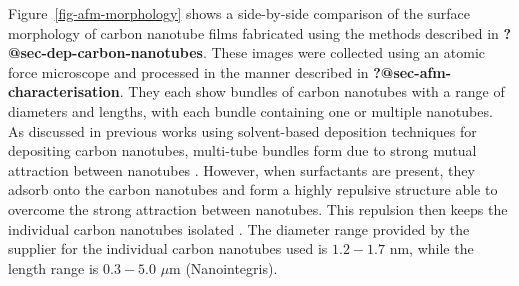 \documentclass[
  a4paper,
]{scrbook}
\begin{document}
Figure~\ref{fig-afm-morphology} shows a side-by-side comparison of the
surface morphology of carbon nanotube films fabricated using the methods
described in \textbf{?@sec-dep-carbon-nanotubes}. These images were
collected using an atomic force microscope and processed in the manner
described in \textbf{?@sec-afm-characterisation}. They each show bundles
of carbon nanotubes with a range of diameters and lengths, with each
bundle containing one or multiple nanotubes. As discussed in previous
works using solvent-based deposition techniques for depositing carbon
nanotubes, multi-tube bundles form due to strong mutual attraction
between nanotubes
\autocite{Zheng2017,Thanihaichelvan2018,Thanihaichelvan2019,Nguyen2021}.
However, when surfactants are present, they adsorb onto the carbon
nanotubes and form a highly repulsive structure able to overcome the
strong attraction between nanotubes. This repulsion then keeps the
individual carbon nanotubes isolated
\autocite{Wenseleers2004,Shimizu2013}. The diameter range provided by
the supplier for the individual carbon nanotubes used is \(1.2-1.7\) nm,
while the length range is \(0.3-5.0\) \(\mu\)m (Nanointegris).
\end{document}
